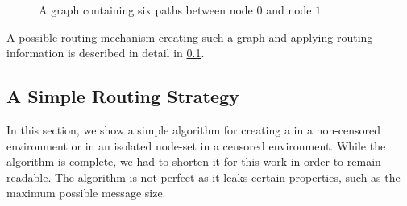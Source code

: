\begin{figure*}[ht]
	\centering
	\resizebox{.9\linewidth}{!}{
		
	}
	\caption{A graph containing six paths between node $0$ and node $1$}\label{fig:graphPaths}
\end{figure*}

A possible routing mechanism creating such a graph and applying routing information is described in detail in \cref{sec:simpleRoutingStrategy}.

\subsection{A Simple Routing Strategy}\label{sec:simpleRoutingStrategy}
In this section, we show a simple algorithm for creating a  in a non-censored environment or in an isolated node-set in a censored environment. While the algorithm is complete, we had to shorten it for this work in order to remain readable. The algorithm is not perfect as it leaks certain properties, such as the maximum possible message size.

